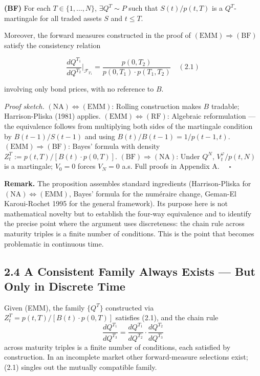 \documentclass[
]{article}
\begin{document}
\textbf{(BF)} For each \(T \in \{1,\ldots,N\}\), \(\exists Q^T \sim P\)
such that \(S(t)/p(t,T)\) is a \(Q^T\)-martingale for all traded assets
\(S\) and \(t \le T\).

Moreover, the forward measures constructed in the proof of
\((\text{EMM}) \Rightarrow (\text{BF})\) satisfy the consistency
relation

\[\frac{dQ^{T_1}}{dQ^{T_2}}\bigg|_{\mathcal{F}_{T_1}} = \frac{p(0,T_2)}{p(0,T_1) \cdot p(T_1,T_2)}   \quad (2.1)\]

involving only bond prices, with no reference to \(B\).

\emph{Proof sketch.} \((\text{NA}) \iff (\text{EMM})\): Rolling
construction makes \(B\) tradable; Harrison-Pliska (1981) applies.
\((\text{EMM}) \iff (\text{RF})\): Algebraic reformulation --- the
equivalence follows from multiplying both sides of the martingale
condition by \(B(t-1)/S(t-1)\) and using \(B(t)/B(t-1) = 1/p(t-1,t)\).
\((\text{EMM}) \Rightarrow (\text{BF})\): Bayes' formula with density
\(Z^T_t := p(t,T)/[B(t) \cdot p(0,T)]\).
\((\text{BF}) \Rightarrow (\text{NA})\): Under \(Q^N\),
\(V^\varphi_t/p(t,N)\) is a martingale; \(V_0 = 0\) forces \(V_N = 0\)
a.s. Full proofs in Appendix A. \(\quad\square\)

\textbf{Remark.} The proposition assembles standard ingredients
(Harrison-Pliska for \((\text{NA}) \iff (\text{EMM})\), Bayes' formula
for the numéraire change, Geman-El Karoui-Rochet 1995 for the general
framework). Its purpose here is not mathematical novelty but to
establish the four-way equivalence and to identify the precise point
where the argument uses discreteness: the chain rule across maturity
triples is a finite number of conditions. This is the point that becomes
problematic in continuous time.

\subsection{2.4 A Consistent Family Always Exists --- But Only in
Discrete
Time}\label{a-consistent-family-always-exists-but-only-in-discrete-time}

Given (EMM), the family \(\{Q^T\}\) constructed via
\(Z^T_t = p(t,T)/[B(t) \cdot p(0,T)]\) satisfies (2.1), and the chain
rule
\[\frac{dQ^{T_1}}{dQ^{T_3}} = \frac{dQ^{T_1}}{dQ^{T_2}} \cdot \frac{dQ^{T_2}}{dQ^{T_3}}\]
across maturity triples is a finite number of conditions, each satisfied
by construction. In an incomplete market other forward-measure
selections exist; (2.1) singles out the mutually compatible family.
\end{document}
